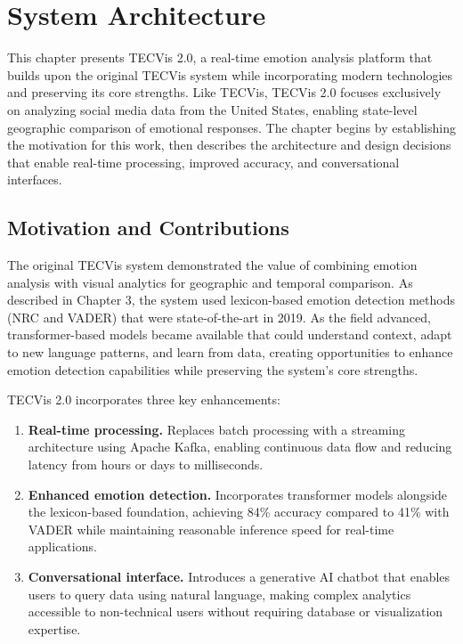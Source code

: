 
\chapter{System Architecture}
\label{Chapter4}


This chapter presents TECVis 2.0, a real-time emotion analysis platform that builds upon the original TECVis system while incorporating modern technologies and preserving its core strengths. Like TECVis, TECVis 2.0 focuses exclusively on analyzing social media data from the United States, enabling state-level geographic comparison of emotional responses. The chapter begins by establishing the motivation for this work, then describes the architecture and design decisions that enable real-time processing, improved accuracy, and conversational interfaces.


\section{Motivation and Contributions}

The original TECVis system demonstrated the value of combining emotion analysis with visual analytics for geographic and temporal comparison. As described in Chapter 3, the system used lexicon-based emotion detection methods (NRC and VADER) that were state-of-the-art in 2019. As the field advanced, transformer-based models became available that could understand context, adapt to new language patterns, and learn from data, creating opportunities to enhance emotion detection capabilities while preserving the system's core strengths.

TECVis 2.0 incorporates three key enhancements:

\begin{enumerate}
\item \textbf{Real-time processing.} Replaces batch processing with a streaming architecture using Apache Kafka, enabling continuous data flow and reducing latency from hours or days to milliseconds.

\item \textbf{Enhanced emotion detection.} Incorporates transformer models alongside the lexicon-based foundation, achieving 84\% accuracy compared to 41\% with VADER while maintaining reasonable inference speed for real-time applications.

\item \textbf{Conversational interface.} Introduces a generative AI chatbot that enables users to query data using natural language, making complex analytics accessible to non-technical users without requiring database or visualization expertise.
\end{enumerate}

